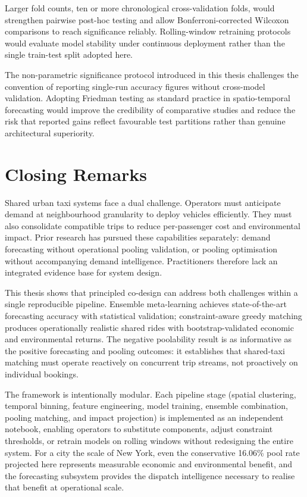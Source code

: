 Larger fold counts, ten or more chronological cross-validation folds, would strengthen pairwise post-hoc testing and allow Bonferroni-corrected Wilcoxon comparisons to reach significance reliably. Rolling-window retraining protocols would evaluate model stability under continuous deployment rather than the single train-test split adopted here.

The non-parametric significance protocol introduced in this thesis challenges the convention of reporting single-run accuracy figures without cross-model validation. Adopting Friedman testing as standard practice in spatio-temporal forecasting would improve the credibility of comparative studies and reduce the risk that reported gains reflect favourable test partitions rather than genuine architectural superiority.

\section{Closing Remarks}

Shared urban taxi systems face a dual challenge. Operators must anticipate demand at neighbourhood granularity to deploy vehicles efficiently. They must also consolidate compatible trips to reduce per-passenger cost and environmental impact. Prior research has pursued these capabilities separately: demand forecasting without operational pooling validation, or pooling optimisation without accompanying demand intelligence. Practitioners therefore lack an integrated evidence base for system design.

This thesis shows that principled co-design can address both challenges within a single reproducible pipeline. Ensemble meta-learning achieves state-of-the-art forecasting accuracy with statistical validation; constraint-aware greedy matching produces operationally realistic shared rides with bootstrap-validated economic and environmental returns. The negative poolability result is as informative as the positive forecasting and pooling outcomes: it establishes that shared-taxi matching must operate reactively on concurrent trip streams, not proactively on individual bookings.

The framework is intentionally modular. Each pipeline stage (spatial clustering, temporal binning, feature engineering, model training, ensemble combination, pooling matching, and impact projection) is implemented as an independent notebook, enabling operators to substitute components, adjust constraint thresholds, or retrain models on rolling windows without redesigning the entire system. For a city the scale of New York, even the conservative 16.06\% pool rate projected here represents measurable economic and environmental benefit, and the forecasting subsystem provides the dispatch intelligence necessary to realise that benefit at operational scale.

